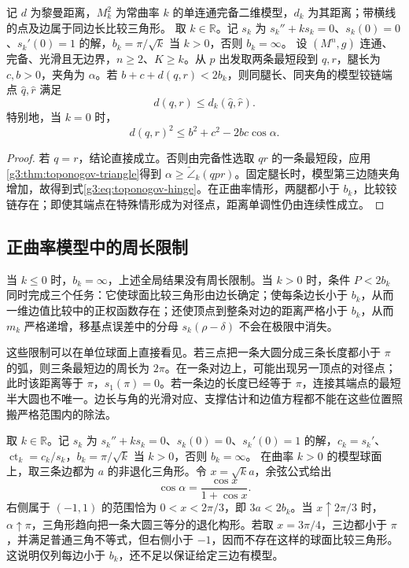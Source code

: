 \begin{corollary}\label{g3:cor:toponogov-hinge}
	记 \(d\) 为黎曼距离，\(M_k^2\) 为常曲率 \(k\) 的单连通完备二维模型，\(d_k\) 为其距离；带横线的点及边属于同边长比较三角形。
	取 \(k\in\mathbb R\)。记 \(s_k\) 为 \(s_k''+ks_k=0\)、\(s_k(0)=0\)、\(s_k'(0)=1\) 的解，\(b_k=\pi/\sqrt k\) 当 \(k>0\)，否则 \(b_k=\infty\)。
 设 \((M^n,g)\) 连通、完备、光滑且无边界，\(n\ge2\)、\(K\ge k\)。从 \(p\) 出发取两条最短段到 \(q,r\)，腿长为 \(c,b>0\)，夹角为 \(\alpha\)。若
 \(b+c+d(q,r)<2b_k\)，则同腿长、同夹角的模型铰链端点 \(\hat q,\hat r\) 满足
 \begin{equation}\label{g3:eq:toponogov-hinge}
 d(q,r)\le d_k(\hat q,\hat r).
 \end{equation}
 特别地，当 \(k=0\) 时，
 \[
 d(q,r)^2\le b^2+c^2-2bc\cos\alpha.
 \]
\end{corollary}
\begin{proof}
 若 \(q=r\)，结论直接成立。否则由完备性选取 \(qr\) 的一条最短段，应用\cref{g3:thm:toponogov-triangle}得到 \(\alpha\ge\widetilde\angle_k(qpr)\)。固定腿长时，模型第三边随夹角增加，故得到式\eqref{g3:eq:toponogov-hinge}。在正曲率情形，两腿都小于 \(b_k\)，比较铰链存在；即使其端点在特殊情形成为对径点，距离单调性仍由连续性成立。
\end{proof}

\subsection{正曲率模型中的周长限制}
\label{g3:subsec:0903:04}

当 \(k\le0\) 时，\(b_k=\infty\)，上述全局结果没有周长限制。当 \(k>0\) 时，条件 \(P<2b_k\) 同时完成三个任务：它使球面比较三角形由边长确定；使每条边长小于 \(b_k\)，从而一维边值比较中的正权函数存在；还使顶点到整条对边的距离严格小于 \(b_k\)，从而 \(m_k\) 严格递增，移基点误差中的分母 \(s_k(\rho-\delta)\) 不会在极限中消失。

\ProseParagraphBreak

这些限制可以在单位球面上直接看见。若三点把一条大圆分成三条长度都小于 \(\pi\) 的弧，则三条最短边的周长为 \(2\pi\)。在一条对边上，可能出现另一顶点的对径点；此时该距离等于 \(\pi\)，\(s_1(\pi)=0\)。若一条边的长度已经等于 \(\pi\)，连接其端点的最短半大圆也不唯一。边长与角的光滑对应、支撑估计和边值方程都不能在这些位置照搬严格范围内的除法。

\begin{example}\label{g3:exm:spherical-perimeter-threshold}
	取 \(k\in\mathbb R\)。记 \(s_k\) 为 \(s_k''+ks_k=0\)、\(s_k(0)=0\)、\(s_k'(0)=1\) 的解，\(c_k=s_k'\)、\(\operatorname{ct}_k=c_k/s_k\)，\(b_k=\pi/\sqrt k\) 当 \(k>0\)，否则 \(b_k=\infty\)。
 在曲率 \(k>0\) 的模型球面上，取三条边都为 \(a\) 的非退化三角形。令 \(x=\sqrt{k}a\)，余弦公式给出
 \[
 \cos\alpha=\frac{\cos x}{1+\cos x}.
 \]
 右侧属于 \((-1,1)\) 的范围恰为 \(0<x<2\pi/3\)，即 \(3a<2b_k\)。当 \(x\uparrow2\pi/3\) 时，\(\alpha\uparrow\pi\)，三角形趋向把一条大圆三等分的退化构形。若取 \(x=3\pi/4\)，三边都小于 \(\pi\)，并满足普通三角不等式，但右侧小于 \(-1\)，因而不存在这样的球面比较三角形。这说明仅列每边小于 \(b_k\)，还不足以保证给定三边有模型。
\end{example}

